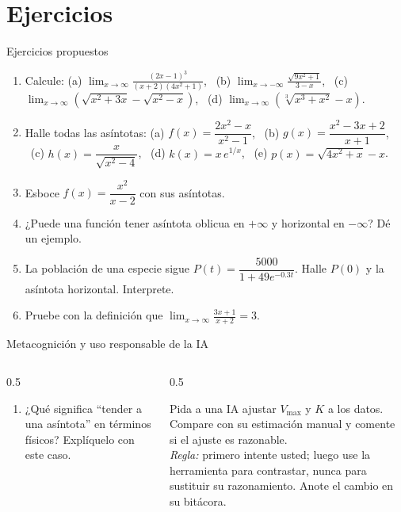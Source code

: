 \documentclass[10pt,aspectratio=169]{beamer}
\begin{document}
\section{Ejercicios}

\begin{frame}{Ejercicios propuestos}
  \small
  \begin{ejercicio}
    \begin{enumerate}
      \item Calcule: (a) $\displaystyle\lim_{x\to\infty}\frac{(2x-1)^3}{(x+2)(4x^2+1)}$, \ (b) $\displaystyle\lim_{x\to-\infty}\frac{\sqrt{9x^2+1}}{3-x}$,
        \ (c) $\displaystyle\lim_{x\to\infty}\left(\sqrt{x^2+3x}-\sqrt{x^2-x}\right)$, \ (d) $\displaystyle\lim_{x\to\infty}\left(\sqrt[3]{x^3+x^2}-x\right)$.
      \item Halle todas las asíntotas: (a) $f(x)=\dfrac{2x^2-x}{x^2-1}$, \ (b) $g(x)=\dfrac{x^2-3x+2}{x+1}$, \ (c) $h(x)=\dfrac{x}{\sqrt{x^2-4}}$,
        \ (d) $k(x)=x\,e^{1/x}$, \ (e) $p(x)=\sqrt{4x^2+x}-x$.
      \item Esboce $f(x)=\dfrac{x^2}{x-2}$ con sus asíntotas.
      \item ¿Puede una función tener asíntota oblicua en $+\infty$ y horizontal en $-\infty$? Dé un ejemplo.
      \item La población de una especie sigue $P(t)=\dfrac{5000}{1+49e^{-0.3t}}$. Halle $P(0)$ y la asíntota horizontal. Interprete.
      \item Pruebe con la definición que $\displaystyle\lim_{x\to\infty}\frac{3x+1}{x+2}=3$.
    \end{enumerate}
  \end{ejercicio}
\end{frame}

\begin{frame}{Metacognición y uso responsable de la IA}
  \small
  \begin{columns}[t]
    \begin{column}{0.5\textwidth}
      \begin{metacog}
        \begin{enumerate}
          \metacomun
          \item ¿Qué significa ``tender a una asíntota'' en términos físicos? Explíquelo con este caso.
        \end{enumerate}
      \end{metacog}
    \end{column}
    \begin{column}{0.5\textwidth}
      \begin{iabox}
        Pida a una IA ajustar $V_{\max}$ y $K$ a los datos. Compare con su estimación manual y comente si el ajuste es razonable.\\[2pt]
        \textit{Regla:} primero intente usted; luego use la herramienta para contrastar, nunca para sustituir su razonamiento. Anote el cambio en su bitácora.
      \end{iabox}
    \end{column}
  \end{columns}
\end{frame}
\end{document}
